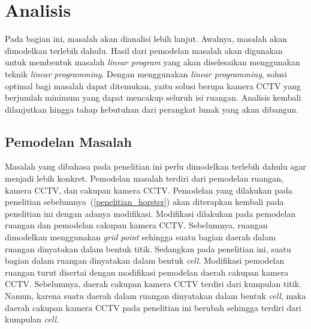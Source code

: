 \chapter{Analisis}
Pada bagian ini, masalah akan dianalisi lebih lanjut. Awalnya, masalah akan dimodelkan terlebih dahulu. Hasil dari pemodelan masalah akan digunakan untuk membentuk masalah \textit{linear program} yang akan diselesaikan menggunakan teknik \textit{linear programming}. Dengan menggunakan \textit{linear programming}, solusi optimal bagi masalah dapat ditemukan, yaitu solusi berupa kamera CCTV yang berjumlah minimum yang dapat mencakup seluruh isi ruangan. Analisis kembali dilanjutkan hingga tahap kebutuhan dari perangkat lunak yang akan dibangun.

\section{Pemodelan Masalah}
Masalah yang dibahasa pada penelitian ini perlu dimodelkan terlebih dahulu agar menjadi lebih konkret. Pemodelan masalah terdiri dari pemodelan ruangan, kamera CCTV, dan cakupan kamera CCTV. Pemodelan yang dilakukan pada penelitian sebelumnya~(\ref{penelitian_horster}) akan diterapkan kembali pada penelitian ini dengan adanya modifikasi. Modifikasi dilakukan pada pemodelan ruangan dan pemodelan cakupan kamera CCTV. Sebelumnya, ruangan dimodelkan menggunakan \textit{grid point} sehingga suatu bagian daerah dalam ruangan dinyatakan dalam bentuk titik. Sedangkan pada penelitian ini, suatu bagian dalam ruangan dinyatakan dalam bentuk \textit{cell}. Modifikasi pemodelan ruangan turut disertai dengan modifikasi pemodelan daerah cakupan kamera CCTV. Sebelumnya, daerah cakupan kamera CCTV terdiri dari kumpulan titik. Namun, karena suatu daerah dalam ruangan dinyatakan dalam bentuk \textit{cell}, maka daerah cakupan kamera CCTV pada penelitian ini berubah sehingga terdiri dari kumpulan \textit{cell}.



